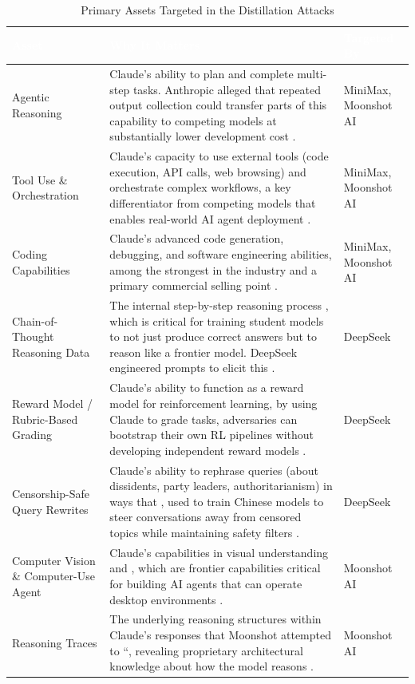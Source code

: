 \documentclass[11pt,a4paper]{article}
\begin{document}
\begin{table}[H]
\centering
\small
\renewcommand{\arraystretch}{1.2}
\begin{tabularx}{\textwidth}{|L{3.2cm}|X|L{2.5cm}|}
\hline
{}
\textcolor{white}{\textbf{Asset}} & \textcolor{white}{\textbf{Why It Matters}} & \textcolor{white}{\textbf{Targeted By}} \\
\hline
Agentic Reasoning & Claude's ability to plan and complete multi-step tasks. Anthropic alleged that repeated output collection could transfer parts of this capability to competing models at substantially lower development cost \cite{anthropic_blog}\cite{treblle}. & MiniMax, Moonshot AI \\
Tool Use \& Orchestration & Claude's capacity to use external tools (code execution, API calls, web browsing) and orchestrate complex workflows, a key differentiator from competing models that enables real-world AI agent deployment \cite{anthropic_blog}. & MiniMax, Moonshot AI \\
Coding Capabilities & Claude's advanced code generation, debugging, and software engineering abilities, among the strongest in the industry and a primary commercial selling point \cite{anthropic_blog}. & MiniMax, Moonshot AI \\
Chain-of-Thought Reasoning Data & The internal step-by-step reasoning process , which is critical for training student models to not just produce correct answers but to reason like a frontier model. DeepSeek engineered prompts to elicit this \cite{anthropic_blog}. & DeepSeek \\
Reward Model / Rubric-Based Grading & Claude's ability to function as a reward model for reinforcement learning, by using Claude to grade tasks, adversaries can bootstrap their own RL pipelines without developing independent reward models \cite{anthropic_blog}. & DeepSeek \\
Censorship-Safe Query Rewrites & Claude's ability to rephrase queries (about dissidents, party leaders, authoritarianism) in ways that , used to train Chinese models to steer conversations away from censored topics while maintaining safety filters \cite{anthropic_blog}. & DeepSeek \\
Computer Vision \& Computer-Use Agent & Claude's capabilities in visual understanding and , which are frontier capabilities critical for building AI agents that can operate desktop environments \cite{anthropic_blog}. & Moonshot AI \\
Reasoning Traces & The underlying reasoning structures within Claude's responses that Moonshot attempted to ``, revealing proprietary architectural knowledge about how the model reasons \cite{anthropic_blog}. & Moonshot AI \\
\hline
\end{tabularx}
\caption{Primary Assets Targeted in the Distillation Attacks}
\label{tab:assets}
\end{table}
\end{document}
